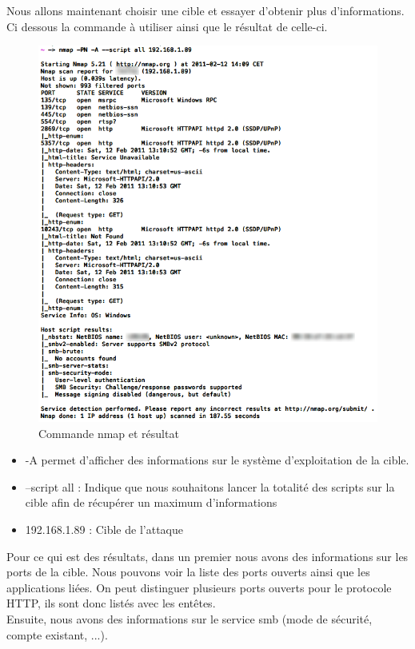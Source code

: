 \documentclass[a4paper,12pt]{article}
\begin{document}
Nous allons maintenant choisir une cible et essayer d'obtenir plus d'informations. Ci dessous la commande à utiliser ainsi que le résultat de celle-ci.
\begin{figure}[H]
	\center
	\includegraphics[width=15cm]{img/nmap.png}
	\caption{Commande nmap et résultat}
\end{figure}

\begin{itemize}
	\item -A permet d'afficher des informations sur le système d'exploitation de la cible.
	\item --script all : Indique que nous souhaitons lancer la totalité des scripts sur la cible afin de récupérer un maximum d'informations
	\item 192.168.1.89 : Cible de l'attaque 
\end{itemize}

Pour ce qui est des résultats, dans un premier nous avons des informations sur les ports de la cible. Nous pouvons voir la liste des ports ouverts
ainsi que les applications liées. On peut distinguer plusieurs ports ouverts pour le protocole HTTP, ils sont donc listés avec les entêtes.\\
Ensuite, nous avons des informations sur le service smb (mode de sécurité, compte existant, ...). 
\end{document}
